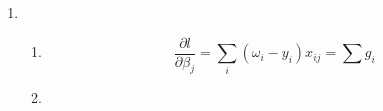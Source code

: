 \documentclass{article}
\begin{document}
\begin{enumerate}
\item
\begin{enumerate}[A]
\item
\[
\frac{\partial l}{\partial\beta_j}=\sum_i(\omega_i-y_i)x_{ij}=\sum g_i
\]
\item
\end{enumerate}
\end{enumerate}
\end{document}
